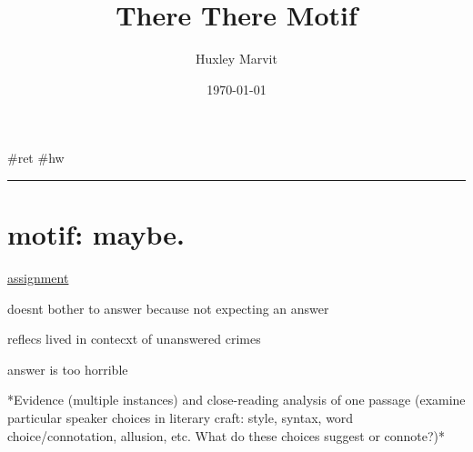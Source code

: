 \documentclass[letterpaper]{article}
\author{Huxley Marvit}
\date{\today}
\title{There There Motif}
\renewcommand{\tableofcontents}{}
\begin{document}
\tableofcontents

\#ret \#hw

\noindent\rule{\textwidth}{0.5pt}

\section{motif: maybe.}
\label{sec:org6b05ba3}
\href{https://docs.google.com/document/d/1AzruqoxZE4CwH\_yfuWJDRB9tF0qZuTVk8UNt14dpZFQ/edit}{assignment}

doesnt bother to answer because not expecting an answer

reflecs lived in contecxt of unanswered crimes

answer is too horrible

*Evidence (multiple instances) and close-reading analysis of one passage
(examine particular speaker choices in literary craft: style, syntax,
word choice/connotation, allusion, etc. What do these choices suggest or
connote?)*
\end{document}
